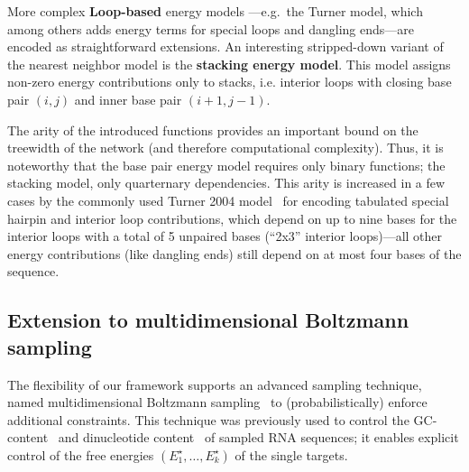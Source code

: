 \documentclass{bioinfo}
\newcommand{\val}{\bar S} %
\newcommand{\Ehp}[1]{E^{\textrm{hp}}(#1)}
\newcommand{\Def}[1]{{\bfseries #1}}
\newcommand{\TargetE}{E^{\star}}
\newcommand{\Nuc}[1]{{\sf #1}}
\newcommand{\Cb}{\Nuc{C}}
\newcommand{\Gb}{\Nuc{G}}
\newcommand{\GCb}{\Gb\Cb}
\newcommand{\evalfor}[2]{#1\llbracket{}#2\rrbracket{}}
\begin{document}

More complex \Def{Loop-based}
 energy models ---e.g.~the Turner model,
which among others adds energy terms for special loops and dangling
ends---are encoded as straightforward extensions. An interesting
stripped-down variant of the nearest neighbor model is the
\Def{stacking energy model}. This model assigns non-zero energy
contributions only to stacks, i.e. interior loops with closing base
pair $(i,j)$ and inner base pair $(i+1,j-1)$.

The arity of the introduced functions provides an important bound on the
treewidth of the network (and therefore computational
complexity). Thus, it is noteworthy that the base pair energy model
requires only binary functions; the stacking model, only quarternary
dependencies. This arity is increased in a few cases by the commonly
used Turner 2004 model~\citep{Turner2009} for encoding tabulated
special hairpin and interior loop contributions, which depend on up to
nine bases for the interior loops with a total of 5 unpaired bases
(``2x3'' interior loops)---all other energy contributions (like
dangling ends) still depend on at most four bases of the sequence.

\subsection{Extension to multidimensional Boltzmann sampling}\label{sec:multiBoltzmann}
The flexibility of our framework supports an advanced sampling technique, named multidimensional Boltzmann sampling~\citep{Bodini2010} to (probabilistically) enforce additional constraints.
This technique was previously used to control the \GCb-content~\citep{Waldispuehl2011,Reinharz2013} and dinucleotide content~\citep{Zhang2013} of sampled RNA sequences; it enables explicit control of the free energies $(\TargetE_1,\ldots,\TargetE_k)$ of the single targets. %
\end{document}
